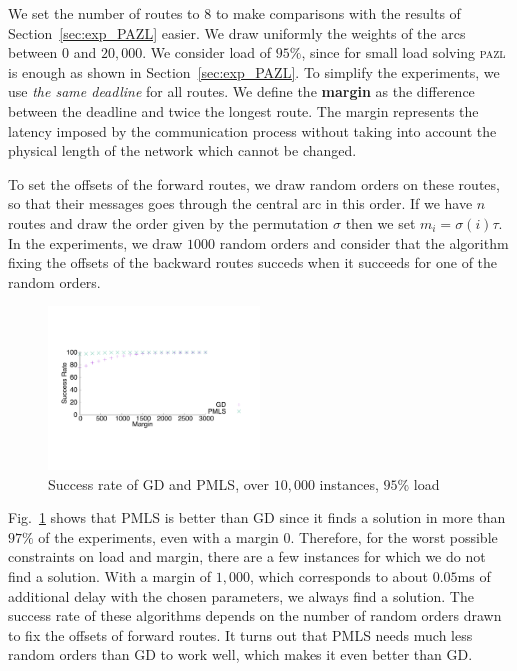 \documentclass[a4paper,10pt]{IEEEtran}
\newcommand\pazl{\textsc{pazl}\xspace}
\begin{document}
    We set the number of routes to $8$ to make comparisons with the results of Section~\ref{sec:exp_PAZL} easier. 
    We draw uniformly the weights of the arcs between $0$ and $20,000$. We consider load of $95\%$, since for small load solving \pazl is enough as shown in Section~\ref{sec:exp_PAZL}. To simplify the experiments, 
    we use \emph{the same deadline} for all routes. We define the {\bf margin} as the difference between the deadline and twice the longest route. The margin represents the latency imposed by the communication process without taking into account the physical length of the network which cannot be changed.
  
   
   To set the offsets of the forward routes, we draw random orders on these routes, so that their messages goes through 
   the central arc in this order. If we have $n$ routes and draw the order given by the permutation $\sigma$ then we set $m_{i} = \sigma(i)\tau$. In the experiments, we draw $1000$ random orders and consider that the algorithm fixing the offsets of the backward routes succeds when it succeeds for one of the random orders.
      
     
    \begin{figure} 
       \begin{center}
      \includegraphics[width=0.5\textwidth]{retour_21000.pdf}
      \end{center}
      \caption{Success rate of GD and PMLS, over $10,000$ instances, $95\%$ load}
     \label{fig:success21000}
    
     \end{figure}
        
     
Fig.~\ref{fig:success21000} shows that PMLS is better than GD since it finds a solution in more than $97\%$ of the experiments, even with a margin $0$. Therefore, for the worst possible constraints on load and margin, there are a few instances for which we do not find a solution. With a margin of $1,000$, which corresponds to about $0.05$ms of additional delay with the chosen parameters, we always find a solution. The success rate of these algorithms depends on the number of random orders drawn to fix the offsets of forward routes. It turns out that PMLS needs much less random orders than GD to work well, which makes it even better than GD.   
\end{document}
